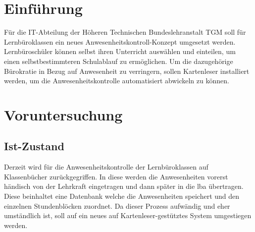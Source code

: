 


\section{Einführung}
Für die IT-Abteilung der Höheren Technischen Bundeslehranstalt TGM soll für
Lernbüroklassen ein neues Anwesenheitskontroll-Konzept umgesetzt werden.
Lernbüroschüler können selbst ihren Unterricht auswählen und einteilen, um
einen selbstbestimmteren Schulablauf zu ermöglichen. Um die dazugehörige
Bürokratie in Bezug auf Anwesenheit zu verringern, sollen Kartenleser
installiert werden, um die Anwesenheitskontrolle automatisiert abwickeln zu
können.

\section{Voruntersuchung}
\subsection{Ist-Zustand}
Derzeit wird für die Anwesenheitskontrolle der Lernbüroklassen auf Klassenbücher zurückgegriffen. In diese werden die Anwesenheiten vorerst händisch von der Lehrkraft eingetragen und dann später in die \gls{lba} übertragen. Diese beinhaltet eine Datenbank welche die Anwesenheiten speichert und den einzelnen Stundenblöcken zuordnet. Da dieser Prozess aufwändig und eher umständlich ist, soll auf ein neues auf Kartenleser-gestütztes System umgestiegen werden.

